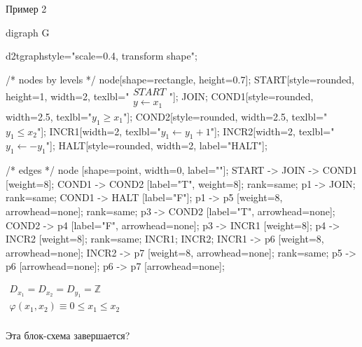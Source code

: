 \documentclass[hyperref={unicode=true}]{beamer}
\begin{document}
    \begin{frame}[fragile]{Пример 2}
    \begin{multicols}{2}
	\huge
	\begin{dot2tex}[options=-traw]
	digraph G{
		d2tgraphstyle="scale=0.4, transform shape";

		/* nodes by levels */
		node[shape=rectangle, height=0.7];
		START[style=rounded, height=1, width=2, texlbl="$\begin{matrix}START\\ y \leftarrow x_1\end{matrix}$"];
		JOIN;
        COND1[style=rounded, width=2.5, texlbl="$y_1 \geq x_1$"];
        COND2[style=rounded, width=2.5, texlbl="$y_1 \leq x_2$"];
		INCR1[width=2, texlbl="$y_1 \leftarrow y_1 + 1$"];
		INCR2[width=2, texlbl="$y_1 \leftarrow -y_1$"];
        HALT[style=rounded, width=2, label="HALT"];

		/* edges */
		node [shape=point, width=0, label=""];
		START -> JOIN -> COND1 [weight=8];
        COND1 -> COND2 [label="T", weight=8];
		{ rank=same; p1 -> JOIN; }
        { rank=same; COND1 -> HALT [label="F"]; }
		p1 -> p5 [weight=8, arrowhead=none];
		{ rank=same; p3 -> COND2 [label="T", arrowhead=none]; COND2 -> p4 [label="F", arrowhead=none]; }
		p3 -> INCR1 [weight=8];
		p4 -> INCR2 [weight=8];
		{ rank=same; INCR1; INCR2; }
		INCR1 -> p6 [weight=8, arrowhead=none];
		INCR2 -> p7 [weight=8, arrowhead=none];
		{ rank=same; p5 -> p6 [arrowhead=none]; p6 -> p7 [arrowhead=none]; }
        }
	\end{dot2tex}

	\normalsize

    $\begin{matrix}
    D_{x_1} = D_{x_2} = D_{y_1} = \mathbb{Z}\\
    \varphi(x_1, x_2) \equiv 0 \leq x_1 \leq x_2\\
    \end{matrix}$

    Эта блок-схема завершается?
    \end{multicols}
    \end{frame}
\end{document}
